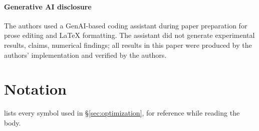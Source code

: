 \documentclass[acmsmall,anonymous,review,nonacm,10pt]{acmart}
\begin{document}
\paragraph*{Generative AI disclosure}
The authors used a GenAI-based coding assistant during paper
preparation for prose editing and
LaTeX formatting. The assistant did not generate experimental
results, claims, numerical findings; all
results in this paper were produced by the authors' implementation
and verified by the authors.



\appendix

\section{Notation}
\label{ap:notation}

 lists every symbol used in
\S\ref{sec:optimization}, for reference while reading the body.
\end{document}
